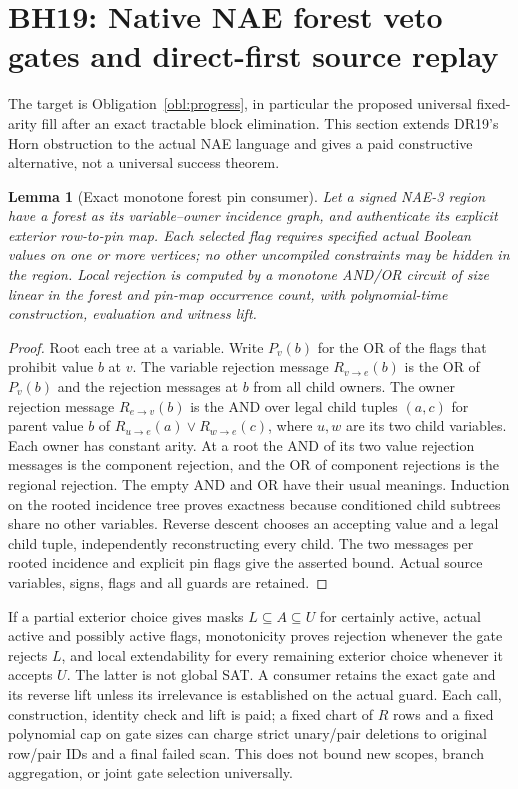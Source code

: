 \documentclass[11pt]{article}
\newtheorem{lemma}[theorem]{Lemma}
\begin{document}
\section{BH19: Native NAE forest veto gates and direct-first source replay}\label{sec:bh19}
The target is Obligation~\ref{obl:progress}, in particular the proposed universal fixed-arity fill after an exact tractable block elimination. This section extends DR19's Horn obstruction to the actual NAE language and gives a paid constructive alternative, not a universal success theorem.
\begin{lemma}[Exact monotone forest pin consumer]\label{lem:bh19-gate}
Let a signed NAE-3 region have a forest as its variable--owner incidence graph, and authenticate its explicit exterior row-to-pin map. Each selected flag requires specified actual Boolean values on one or more vertices; no other uncompiled constraints may be hidden in the region. Local rejection is computed by a monotone AND/OR circuit of size linear in the forest and pin-map occurrence count, with polynomial-time construction, evaluation and witness lift.
\end{lemma}
\begin{proof}
Root each tree at a variable. Write $P_v(b)$ for the OR of the flags that prohibit value $b$ at $v$. The variable rejection message $R_{v\to e}(b)$ is the OR of $P_v(b)$ and the rejection messages at $b$ from all child owners. The owner rejection message $R_{e\to v}(b)$ is the AND over legal child tuples $(a,c)$ for parent value $b$ of $R_{u\to e}(a)\lor R_{w\to e}(c)$, where $u,w$ are its two child variables. Each owner has constant arity. At a root the AND of its two value rejection messages is the component rejection, and the OR of component rejections is the regional rejection. The empty AND and OR have their usual meanings. Induction on the rooted incidence tree proves exactness because conditioned child subtrees share no other variables. Reverse descent chooses an accepting value and a legal child tuple, independently reconstructing every child. The two messages per rooted incidence and explicit pin flags give the asserted bound. Actual source variables, signs, flags and all guards are retained.
\end{proof}
If a partial exterior choice gives masks $L\subseteq A\subseteq U$ for certainly active, actual active and possibly active flags, monotonicity proves rejection whenever the gate rejects $L$, and local extendability for every remaining exterior choice whenever it accepts $U$. The latter is not global SAT. A consumer retains the exact gate and its reverse lift unless its irrelevance is established on the actual guard. Each call, construction, identity check and lift is paid; a fixed chart of $R$ rows and a fixed polynomial cap on gate sizes can charge strict unary/pair deletions to original row/pair IDs and a final failed scan. This does not bound new scopes, branch aggregation, or joint gate selection universally.
\end{document}
